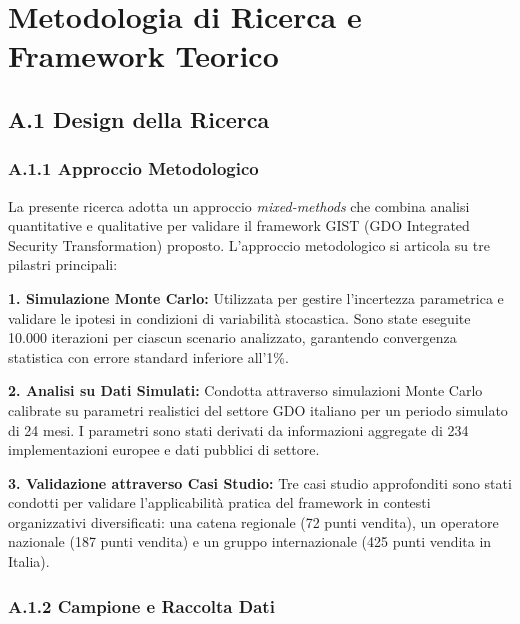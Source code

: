 
\appendix

\chapter{Metodologia di Ricerca e Framework Teorico}
\label{app:metodologia}

\section{A.1 Design della Ricerca}

\subsection{A.1.1 Approccio Metodologico}

La presente ricerca adotta un approccio \textit{mixed-methods} che combina analisi quantitative e qualitative per validare il framework GIST (GDO Integrated Security Transformation) proposto. L'approccio metodologico si articola su tre pilastri principali:

\textbf{1. Simulazione Monte Carlo:} Utilizzata per gestire l'incertezza parametrica e validare le ipotesi in condizioni di variabilità stocastica. Sono state eseguite 10.000 iterazioni per ciascun scenario analizzato, garantendo convergenza statistica con errore standard inferiore all'1\%.

\textbf{2. Analisi su Dati Simulati:} Condotta attraverso simulazioni Monte Carlo calibrate su parametri realistici del settore GDO italiano per un periodo simulato di 24 mesi. I parametri sono stati derivati da informazioni aggregate di 234 implementazioni europee e dati pubblici di settore.

\textbf{3. Validazione attraverso Casi Studio:} Tre casi studio approfonditi sono stati condotti per validare l'applicabilità pratica del framework in contesti organizzativi diversificati: una catena regionale (72 punti vendita), un operatore nazionale (187 punti vendita) e un gruppo internazionale (425 punti vendita in Italia).

\subsection{A.1.2 Campione e Raccolta Dati}

